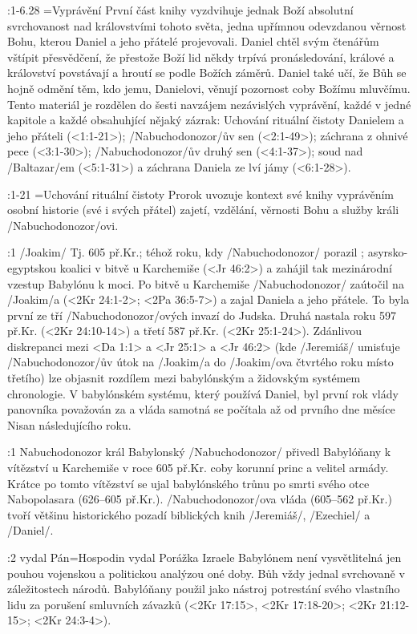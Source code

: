 :1-6.28 {}={Vyprávění}  První část knihy vyzdvihuje jednak Boží absolutní svrchovanost nad královstvími tohoto světa, jedna upřímnou odevzdanou věrnost Bohu, kterou Daniel a jeho přátelé projevovali.
Daniel chtěl svým čtenářům vštípit přesvědčení, že přestože Boží lid někdy trpívá pronásledování, králové a království povstávají a hroutí se podle Božích záměrů. Daniel také učí, že Bůh se hojně odmění těm, kdo jemu, Danielovi, věnují pozornost coby Božímu mluvčímu. Tento materiál je rozdělen do šesti navzájem nezávislých vyprávění, každé v jedné kapitole a každé obsahuhjící nějaký zázrak:
Uchování rituální čistoty Danielem a jeho přáteli (<1:1-21>); \x/Nabuchodonozor/ův sen (<2:1-49>); záchrana z ohnivé pece (<3:1-30>); \x/Nabuchodonozor/ův druhý sen (<4:1-37>); soud nad \x/Baltazar/em (<5:1-31>) a záchrana Daniela ze lví jámy (<6:1-28>).

:1-21 {}={Uchování rituální čistoty}  Prorok uvozuje kontext své knihy vyprávěním osobní historie (své i svých přátel) zajetí, vzdělání, věrnosti Bohu a služby králi \x/Nabuchodonozor/ovi.

:1 {\x/Joakim/}  Tj. 605 př.Kr.; téhož roku, kdy \x/Nabuchodonozor/ porazil ;   asyrsko-egyptskou koalici v bitvě u Karchemiše (<Jr 46:2>) a zahájil tak mezinárodní vzestup Babylónu k moci. Po bitvě u Karchemiše \x/Nabuchodonozor/ zaútočil na \x/Joakim/a (<2Kr 24:1-2>; <2Pa 36:5-7>) a zajal Daniela a jeho přátele. 
To byla první ze tří \x/Nabuchodonozor/ových  invazí do Judska. Druhá nastala roku 597 př.Kr. (<2Kr 24:10-14>) a třetí 587 př.Kr. (<2Kr 25:1-24>). Zdánlivou diskrepanci mezi <Da 1:1> a <Jr 25:1> a <Jr 46:2> (kde \x/Jeremiáš/ umisťuje \x/Nabuchodonozor/ův útok na \x/Joakim/a do \x/Joakim/ova čtvrtého roku místo třetího) lze objasnit rozdílem mezi babylónským a židovským systémem chronologie. V babylónském systému, který používá Daniel, byl první rok vlády panovníka považován za  a vláda samotná se počítala až od prvního dne měsíce Nisan následujícího roku.

:1 {Nabuchodonozor král Babylonský}  \x/Nabuchodonozor/ přivedl Babylóňany k vítězství u Karchemiše v roce 605 př.Kr. coby korunní princ a velitel armády. Krátce po tomto vítězství se ujal babylónského trůnu po smrti svého otce Nabopolasara (626--605 př.Kr.). \x/Nabuchodonozor/ova vláda (605--562 př.Kr.) tvoří většinu historického pozadí  biblických knih \x/Jeremiáš/, \x/Ezechiel/ a \x/Daniel/.

:2 {vydal Pán}={Hospodin vydal} Porážka Izraele Babylónem není vysvětlitelná jen pouhou vojenskou a politickou analýzou oné doby. Bůh vždy jednal svrchovaně v záležitostech národů. Babylóňany použil jako nástroj potrestání svého vlastního lidu za porušení smluvních závazků (<2Kr 17:15>, <2Kr 17:18-20>; <2Kr 21:12-15>; <2Kr 24:3-4>).

